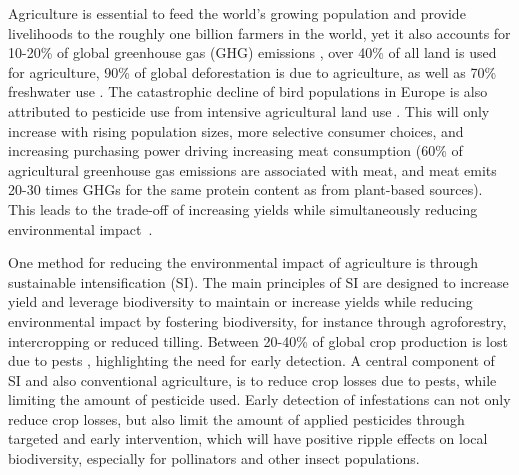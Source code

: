 Agriculture is essential to feed the world's growing  population and provide livelihoods to the roughly one billion farmers in the world, yet it also accounts for 10-20\% of  global greenhouse gas (GHG) emissions \cite{Gert-JanNabuurs2022}, over 40\% of all land is used for agriculture, 90\% of global deforestation is due to agriculture, as well as 70\% freshwater use \cite{WWF2024}. %
The catastrophic decline of bird populations in Europe is also attributed to pesticide use from intensive agricultural land use \cite{Rigal2023}.
This will only increase with rising population sizes, more selective consumer choices, and increasing purchasing power driving increasing meat consumption (60\% of agricultural greenhouse gas emissions are associated with meat, and meat emits 20-30 times GHGs for the same protein content as from plant-based sources)\cite{Xu2021, Poore2018}. This leads to the trade-off of increasing yields while simultaneously reducing environmental  impact~\cite{McGreevy2022}.

One method for reducing the environmental impact of agriculture is through sustainable intensification (SI). The main principles of SI are designed to increase yield and leverage biodiversity to maintain or increase yields while reducing environmental impact by fostering biodiversity, for instance through agroforestry, intercropping or reduced tilling. Between 20-40\% of global crop production is lost due to pests \cite{Savary2019}, highlighting the need for early detection. A central component of SI and also conventional agriculture, is to reduce crop losses due to pests, while limiting the amount of pesticide used. Early detection of infestations can not only reduce crop losses, but also limit the amount of applied pesticides through targeted and early intervention, which will have positive ripple effects on local biodiversity, especially for pollinators and other insect populations. 

